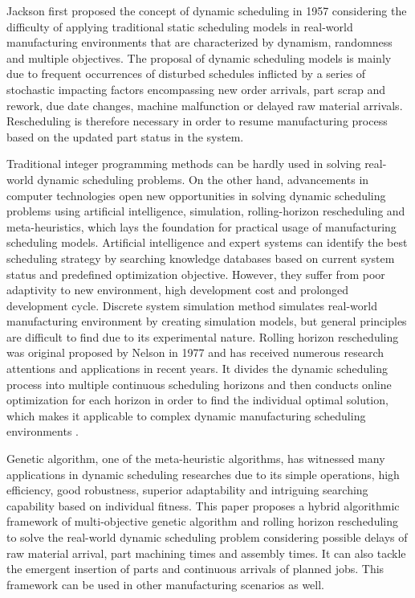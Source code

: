 Jackson first proposed the concept of dynamic scheduling in 1957 considering the difficulty of applying traditional static scheduling models in real-world manufacturing environments that are characterized by dynamism, randomness and multiple objectives. 
The proposal of dynamic scheduling models is mainly due to frequent occurrences of disturbed schedules inflicted by a series of stochastic impacting factors encompassing new order arrivals, part scrap and rework, due date changes, machine malfunction or delayed raw material arrivals.
Rescheduling is therefore necessary in order to resume manufacturing process based on the updated part status in the system.

Traditional integer programming methods can be hardly used in solving real-world dynamic scheduling problems.
On the other hand, advancements in computer technologies open new opportunities in solving dynamic scheduling problems using artificial intelligence, simulation, rolling-horizon rescheduling and meta-heuristics, which lays the foundation for practical usage of manufacturing scheduling models.
Artificial intelligence and expert systems can identify the best scheduling strategy by searching knowledge databases based on current system status and predefined optimization objective.
However, they suffer from poor adaptivity to new environment, high development cost and prolonged development cycle.
Discrete system simulation method simulates real-world manufacturing environment by creating simulation models, but general principles are difficult to find due to its experimental nature.
Rolling horizon rescheduling was original proposed by Nelson in 1977 and has received numerous research attentions and applications in recent years.
It divides the dynamic scheduling process into multiple continuous scheduling horizons and then conducts online optimization for each horizon in order to find the individual optimal solution, which makes it applicable to complex dynamic manufacturing scheduling environments \citep{bierwirth19991, jian19972}.

Genetic algorithm, one of the meta-heuristic algorithms, has witnessed many applications in dynamic scheduling researches due to its simple operations, high efficiency, good robustness, superior adaptability and intriguing searching capability based on individual fitness. 
This paper proposes a hybrid algorithmic framework of multi-objective genetic algorithm and rolling horizon rescheduling to solve the real-world dynamic scheduling problem considering possible delays of raw material arrival, part machining times and assembly times.
It can also tackle the emergent insertion of parts and continuous arrivals of planned jobs.
This framework can be used in other manufacturing scenarios as well.



















